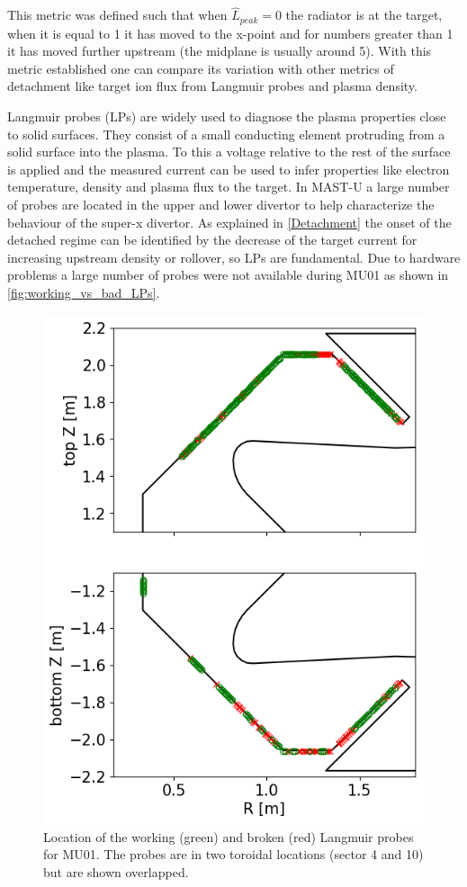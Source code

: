 This metric was defined such that when $\hat{L}_{peak}=0$ the radiator is at the target, when it is equal to 1 it has moved to the x-point and for numbers greater than 1 it has moved further upstream (the midplane is usually around 5). With this metric established one can compare its variation with other metrics of detachment like target ion flux from Langmuir probes and plasma density. 

Langmuir probes (LPs) are widely used to diagnose the plasma properties close to solid surfaces. They consist of a small conducting element protruding from a solid surface into the plasma. To this a voltage relative to the rest of the surface is applied and the measured current can be used to infer properties like electron temperature, density and plasma flux to the target. \cite{Hutchinson2002} In MAST-U a large number of probes are located in the upper and lower divertor to help characterize the behaviour of the super-x divertor.\cite{Lovell2017,Ryan2023} As explained in \autoref{Detachment} the onset of the detached regime can be identified by the decrease of the target current for increasing upstream density or rollover, so LPs are fundamental. Due to hardware problems a large number of probes were not available during MU01 as shown in \autoref{fig:working_vs_bad_LPs}.

\begin{figure}[!ht]
	\centering
	\includegraphics[trim={0 0 0 0},clip,width=0.5\linewidth]{Chapters/chapter2/figs/working_vs_bad_LPs.png}
	\caption{Location of the working (green) and broken (red) Langmuir probes for MU01. The probes are in two toroidal locations (sector 4 and 10) but are shown overlapped.}
	\label{fig:working_vs_bad_LPs}
\end{figure}

